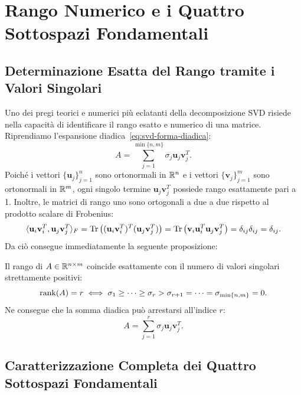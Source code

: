 \FloatBarrier
\section{Rango Numerico e i Quattro Sottospazi Fondamentali}
\label{sec:svd-quattro-sottospazi}

\subsection{Determinazione Esatta del Rango tramite i Valori Singolari}

Uno dei pregi teorici e numerici pi\`u eclatanti della decomposizione SVD risiede nella capacit\`a di identificare il rango esatto e numerico di una matrice.
Riprendiamo l'espansione diadica~\eqref{eq:svd-forma-diadica}:
\begin{equation}
    A = \sum_{j=1}^{\min\{n, m\}} \sigma_j \mathbf{u}_j \mathbf{v}_j^T.
\end{equation}
Poich\'e i vettori $\{\mathbf{u}_j\}_{j=1}^n$ sono ortonormali in $\mathbb{R}^n$ e i vettori $\{\mathbf{v}_j\}_{j=1}^m$ sono ortonormali in $\mathbb{R}^m$, ogni singolo termine $\mathbf{u}_j \mathbf{v}_j^T$ possiede rango esattamente pari a 1. Inoltre, le matrici di rango uno sono ortogonali a due a due rispetto al prodotto scalare di Frobenius:
\begin{equation}
    \langle \mathbf{u}_i \mathbf{v}_i^T, \mathbf{u}_j \mathbf{v}_j^T \rangle_F = \operatorname{Tr}\left( (\mathbf{u}_i \mathbf{v}_i^T)^T (\mathbf{u}_j \mathbf{v}_j^T) \right) = \operatorname{Tr}\left( \mathbf{v}_i \mathbf{u}_i^T \mathbf{u}_j \mathbf{v}_j^T \right) = \delta_{ij} \delta_{ij} = \delta_{ij}.
\end{equation}
Da ci\`o consegue immediatamente la seguente proposizione:

\begin{proposition}
Il rango di $A \in \mathbb{R}^{n \times m}$ coincide esattamente con il numero di valori singolari strettamente positivi:
\begin{equation}
    \operatorname{rank}(A) = r \iff \sigma_1 \ge \dots \ge \sigma_r > \sigma_{r+1} = \dots = \sigma_{\min\{n, m\}} = 0.
\end{equation}
Ne consegue che la somma diadica pu\`o arrestarsi all'indice $r$:
\begin{equation}
    A = \sum_{j=1}^r \sigma_j \mathbf{u}_j \mathbf{v}_j^T.
\end{equation}
\end{proposition}

\subsection{Caratterizzazione Completa dei Quattro Sottospazi Fondamentali}

